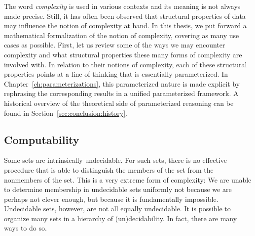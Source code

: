The word \emph{complexity} is used in various contexts and its meaning is not always made precise.
Still, it has often been observed that structural properties of data may influence the notion of complexity at hand.
In this thesis, we put forward a mathematical formalization of the notion of complexity, covering as many use cases as possible.
First, let us review some of the ways we may encounter complexity and what structural properties these many forms of complexity are involved with.
In relation to their notions of complexity, each of these structural properties points at a line of thinking that is essentially parameterized.
In Chapter~\ref{ch:parameterizations}, this parameterized nature is made explicit by rephrasing the corresponding results in a unified parameterized framework.
A historical overview of the theoretical side of parameterized reasoning can be found in Section~\ref{sec:conclusion:history}.

\subsection{Computability}
\label{sec:history:computability}%
Some sets are intrinsically undecidable.
For such sets, there is no effective procedure that is able to distinguish the members of the set from the nonmembers of the set.
This is a very extreme form of complexity:
We are unable to determine membership in undecidable sets uniformly not because we are perhaps not clever enough, but because it is fundamentally impossible.
Undecidable sets, however, are not all equally undecidable.
It is possible to organize many sets in a hierarchy of (un)decidability.
In fact, there are many ways to do so.

